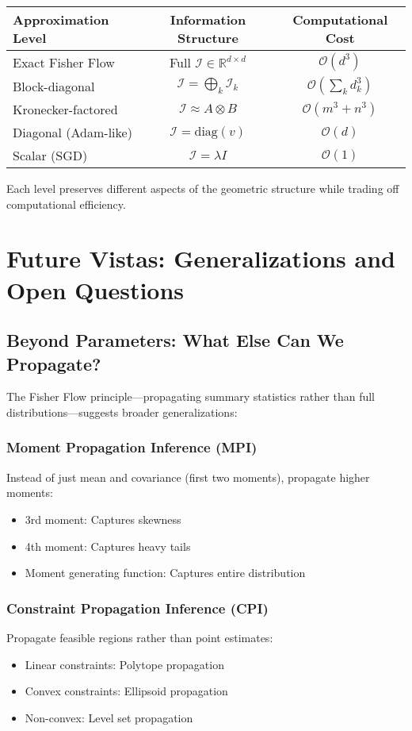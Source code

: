 \documentclass[11pt]{article}
\begin{document}
\begin{center}
\begin{tabular}{lcc}
\toprule
\textbf{Approximation Level} & \textbf{Information Structure} & \textbf{Computational Cost} \\
\midrule
Exact Fisher Flow & Full $\mathcal{I} \in \mathbb{R}^{d \times d}$ & $\mathcal{O}(d^3)$ \\
Block-diagonal & $\mathcal{I} = \bigoplus_k \mathcal{I}_k$ & $\mathcal{O}(\sum_k d_k^3)$ \\
Kronecker-factored & $\mathcal{I} \approx A \otimes B$ & $\mathcal{O}(m^3 + n^3)$ \\
Diagonal (Adam-like) & $\mathcal{I} = \text{diag}(v)$ & $\mathcal{O}(d)$ \\
Scalar (SGD) & $\mathcal{I} = \lambda I$ & $\mathcal{O}(1)$ \\
\bottomrule
\end{tabular}
\end{center}

Each level preserves different aspects of the geometric structure while trading off computational efficiency.

\section{Future Vistas: Generalizations and Open Questions}

\subsection{Beyond Parameters: What Else Can We Propagate?}

The Fisher Flow principle—propagating summary statistics rather than full distributions—suggests broader generalizations:

\subsubsection{Moment Propagation Inference (MPI)}
Instead of just mean and covariance (first two moments), propagate higher moments:
\begin{itemize}
\item 3rd moment: Captures skewness
\item 4th moment: Captures heavy tails
\item Moment generating function: Captures entire distribution
\end{itemize}

\subsubsection{Constraint Propagation Inference (CPI)}
Propagate feasible regions rather than point estimates:
\begin{itemize}
\item Linear constraints: Polytope propagation
\item Convex constraints: Ellipsoid propagation
\item Non-convex: Level set propagation
\end{itemize}
\end{document}

